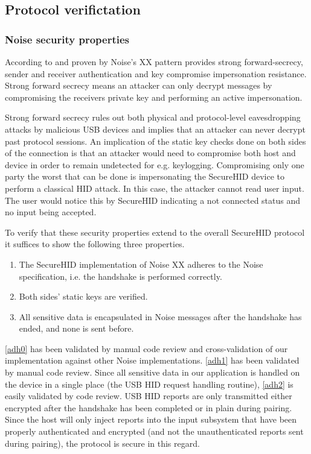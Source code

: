 \documentclass[12pt,a4paper,notitlepage]{article}
\begin{document}
\subsection{Protocol verifictation}
\label{prot_ver}
\subsubsection{Noise security properties}
\label{sec_prop}
According to \textcite{perrin01} and proven by \textcite{kobeissi01} Noise's XX pattern provides strong forward-secrecy,
sender and receiver authentication and key compromise impersonation resistance. Strong forward secrecy means an attacker
can only decrypt messages by compromising the receivers private key and performing an active impersonation.

Strong forward secrecy rules out both physical and protocol-level eavesdropping attacks by malicious USB devices and
implies that an attacker can never decrypt past protocol sessions. An implication of the static key checks done on both
sides of the connection is that an attacker would need to compromise both host and device in order to remain undetected
for e.g. keylogging.  Compromising only one party the worst that can be done is impersonating the SecureHID device to
perform a classical HID attack. In this case, the attacker cannot read user input.  The user would notice this by
SecureHID indicating a not connected status and no input being accepted.

To verify that these security properties extend to the overall SecureHID protocol it suffices to show the following
three properties.
\begin{enumerate}
\item The SecureHID implementation of Noise XX adheres to the Noise specification, i.e. the handshake is performed
	correctly. \label{adh0}
\item Both sides' static keys are verified. \label{adh1}
\item All sensitive data is encapsulated in Noise messages after the handshake has ended, and none is sent before.
	\label{adh2}
\end{enumerate}

\ref{adh0} has been validated by manual code review and cross-validation of our implementation against other Noise
implementations. %
\ref{adh1} has been validated by manual code review. %
Since all sensitive data in our application is handled on the device in a single place (the USB HID request handling
routine), \ref{adh2} is easily validated by code review. USB HID reports are only transmitted either encrypted after the
handshake has been completed or in plain during pairing. Since the host will only inject reports into the input
subsystem that have been properly authenticated and encrypted (and not the unauthenticated reports sent during pairing),
the protocol is secure in this regard.
\end{document}
